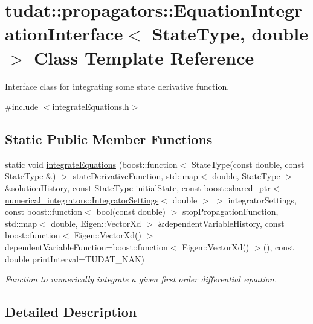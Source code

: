 \hypertarget{classtudat_1_1propagators_1_1EquationIntegrationInterface_3_01StateType_00_01double_01_4}{}\section{tudat\+:\+:propagators\+:\+:Equation\+Integration\+Interface$<$ State\+Type, double $>$ Class Template Reference}
\label{classtudat_1_1propagators_1_1EquationIntegrationInterface_3_01StateType_00_01double_01_4}


Interface class for integrating some state derivative function.  




{\ttfamily \#include $<$integrate\+Equations.\+h$>$}

\subsection*{Static Public Member Functions}
\begin{DoxyCompactItemize}
\item 
static void \hyperlink{classtudat_1_1propagators_1_1EquationIntegrationInterface_3_01StateType_00_01double_01_4_ab676b8724686823a0052a71c0223631d}{integrate\+Equations} (boost\+::function$<$ State\+Type(const double, const State\+Type \&) $>$ state\+Derivative\+Function, std\+::map$<$ double, State\+Type $>$ \&solution\+History, const State\+Type initial\+State, const boost\+::shared\+\_\+ptr$<$ \hyperlink{classtudat_1_1numerical__integrators_1_1IntegratorSettings}{numerical\+\_\+integrators\+::\+Integrator\+Settings}$<$ double $>$ $>$ integrator\+Settings, const boost\+::function$<$ bool(const double) $>$ stop\+Propagation\+Function, std\+::map$<$ double, Eigen\+::\+Vector\+Xd $>$ \&dependent\+Variable\+History, const boost\+::function$<$ Eigen\+::\+Vector\+Xd() $>$ dependent\+Variable\+Function=boost\+::function$<$ Eigen\+::\+Vector\+Xd() $>$(), const double print\+Interval=T\+U\+D\+A\+T\+\_\+\+N\+AN)
\begin{DoxyCompactList}\small\item\em Function to numerically integrate a given first order differential equation. \end{DoxyCompactList}\end{DoxyCompactItemize}


\subsection{Detailed Description}
